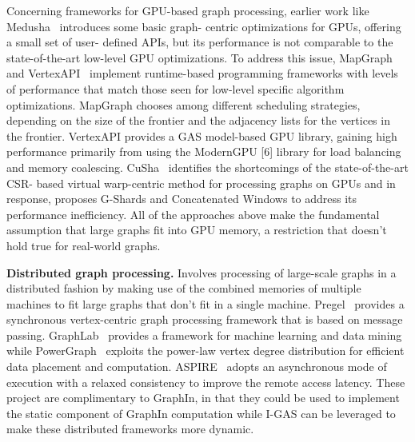 Concerning frameworks for GPU-based graph processing, earlier work like Medusha~\cite{medusa} introduces some basic graph- centric optimizations for GPUs, offering a small set of user- defined APIs, but its performance is not comparable to the state-of-the-art low-level GPU optimizations. To address this issue, MapGraph~\cite{mapgraph} and VertexAPI~\cite{vertexapi} implement runtime-based programming frameworks with levels of performance that match those seen for low-level specific algorithm optimizations. MapGraph chooses among different scheduling strategies, depending on the size of the frontier and the adjacency lists for the vertices in the frontier. VertexAPI provides a GAS model-based GPU library, gaining high performance primarily from using the ModernGPU [6] library for load balancing and memory coalescing. CuSha~\cite{cusha} identifies the shortcomings of the state-of-the-art CSR- based virtual warp-centric method for processing graphs on GPUs and in response, proposes G-Shards and Concatenated Windows to address its performance inefficiency. All of the approaches above make the fundamental assumption that large graphs fit into GPU memory, a restriction that doesn't hold true for real-world graphs.

\textbf{Distributed graph processing.} Involves processing of large-scale graphs in a distributed fashion by making use of the combined memories of multiple machines to fit large graphs that don’t fit in a single machine. Pregel~\cite{pregel} provides a synchronous vertex-centric graph processing framework that is based on message passing. GraphLab~\cite{graphlab} provides a framework for machine learning and data mining while PowerGraph~\cite{powergraph} exploits the power-law vertex degree distribution for efficient data placement and computation. ASPIRE~\cite{aspire} adopts an asynchronous mode of execution with a relaxed consistency to improve the remote access latency. These project are complimentary to GraphIn, in that they could be used to implement the static component of GraphIn  computation while I-GAS can be leveraged to make these distributed frameworks more dynamic. 


